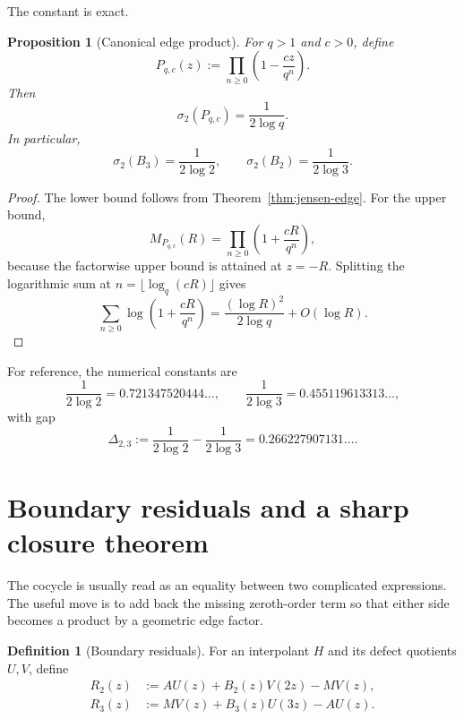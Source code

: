 \documentclass[11pt]{article}
\newtheorem{proposition}[theorem]{Proposition}
\theoremstyle{definition}
\newtheorem{definition}[theorem]{Definition}
\begin{document}
The constant is exact.

\begin{proposition}[Canonical edge product]\label{prop:edge-product-type}
For \(q>1\) and \(c>0\), define
\[
  P_{q,c}(z):=\prod_{n\ge0}\left(1-\frac{cz}{q^n}\right).
\]
Then
\[
  \sigma_2(P_{q,c})=\frac{1}{2\log q}.
\]
In particular,
\begin{equation}\label{eq:edge-types}
  \sigma_2(B_3)=\frac1{2\log2},
  \qquad
  \sigma_2(B_2)=\frac1{2\log3}.
\end{equation}
\end{proposition}

\begin{proof}
The lower bound follows from Theorem~\ref{thm:jensen-edge}.  For the upper bound,
\[
  M_{P_{q,c}}(R)
  =\prod_{n\ge0}\left(1+\frac{cR}{q^n}\right),
\]
because the factorwise upper bound is attained at \(z=-R\).  Splitting the logarithmic sum at \(n=\lfloor\log_q(cR)\rfloor\) gives
\[
  \sum_{n\ge0}\log\left(1+\frac{cR}{q^n}\right)
   =\frac{(\log R)^2}{2\log q}+O(\log R).
\]
\end{proof}

For reference, the numerical constants are
\begin{equation}\label{eq:numerical-thresholds}
  \frac1{2\log2}=0.721347520444\ldots,
  \qquad
  \frac1{2\log3}=0.455119613313\ldots,
\end{equation}
with gap
\begin{equation}\label{eq:type-gap}
  \Delta_{2,3}:=\frac1{2\log2}-\frac1{2\log3}
   =0.266227907131\ldots.
\end{equation}

\section{Boundary residuals and a sharp closure theorem}\label{sec:residuals}

The cocycle is usually read as an equality between two complicated expressions.  The useful move is to add back the missing zeroth-order term so that either side becomes a product by a geometric edge factor.

\begin{definition}[Boundary residuals]\label{def:residuals}
For an interpolant \(H\) and its defect quotients \(U,V\), define
\begin{align}
  R_2(z)
    &:=A U(z)+B_2(z)V(2z)-M V(z),\label{eq:R2-def}\\
  R_3(z)
    &:=M V(z)+B_3(z)U(3z)-A U(z).\label{eq:R3-def}
\end{align}
\end{definition}
\end{document}
